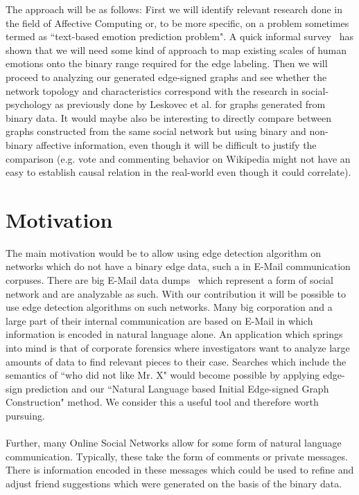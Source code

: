 \documentclass[a4paper,11pt]{scrartcl}
\begin{document}
The approach will be as follows: First we will identify relevant research done in the field of Affective Computing or, to be more specific, on a problem sometimes termed as ``text-based emotion prediction problem". A quick informal survey~\cite{Matousek:2007, Alm:2005, Calvo:2010 } has shown that we will need some kind of approach to map existing scales of human emotions onto the binary range required for the edge labeling. Then we will proceed to analyzing our generated edge-signed graphs and see whether the network topology and characteristics correspond with the research in social-psychology as previously done by Leskovec et al. for graphs generated from binary data. It would maybe also be interesting to directly compare between graphs constructed from the same social network but using binary and non-binary affective information, even though it will be difficult to justify the comparison (e.g. vote and commenting behavior on Wikipedia might not have an easy to establish causal relation in the real-world even though it could correlate).

\section{Motivation}

The main motivation would be to allow using edge detection algorithm on networks which do not have a binary edge data, such a in E-Mail communication corpuses. There are big E-Mail data dumps~\cite{Enron} which represent a form of social network and are analyzable as such. With our contribution it will be possible to use edge detection algorithms on such networks. Many big corporation and a large part of their internal communication are based on E-Mail in which information is encoded in natural language alone. An application which springs into mind is that of corporate forensics where investigators want to analyze large amounts of data to find relevant pieces to their case. Searches which include the semantics of ``who did not like Mr. X" would become possible by applying edge-sign prediction and our ``Natural Language based Initial Edge-signed Graph Construction" method. We consider this a useful tool and therefore worth pursuing.
\\
\\
Further, many Online Social Networks allow for some form of natural language communication. Typically, these take the form of comments or private messages. There is information encoded in these messages which could be used to refine and adjust friend suggestions which were generated on the basis of the binary data.

{}

\end{document}
